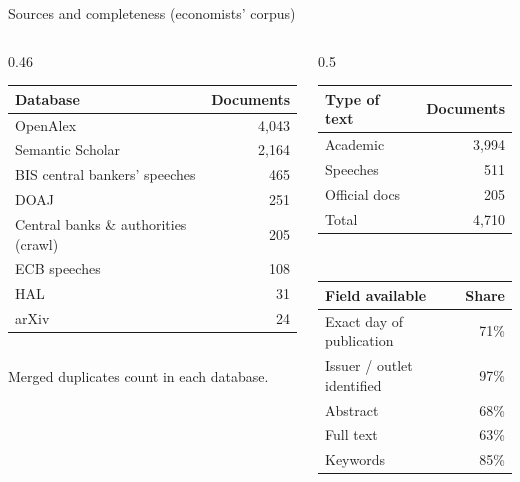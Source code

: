 \documentclass[aspectratio=169,10pt]{beamer}
\begin{document}
\begin{frame}{Sources and completeness (economists' corpus)}
\begin{columns}[T]
\begin{column}{0.46\textwidth}\footnotesize
\begin{tabular}{@{}lr@{}}\toprule
\textbf{Database} & \textbf{Documents}\\\midrule
OpenAlex & 4,043 \\
Semantic Scholar & 2,164 \\
BIS central bankers' speeches & 465 \\
DOAJ & 251 \\
Central banks \& authorities (crawl) & 205 \\
ECB speeches & 108 \\
HAL & 31 \\
arXiv & 24 \\
\bottomrule\end{tabular}\\[2pt]
\scriptsize Merged duplicates count in each database.
\end{column}
\begin{column}{0.5\textwidth}\footnotesize
\begin{tabular}{@{}lr@{}}\toprule
\textbf{Type of text} & \textbf{Documents}\\\midrule
Academic & 3,994 \\
Speeches & 511 \\
Official docs & 205 \\
\midrule Total & 4,710\\\bottomrule\end{tabular}\\[6pt]
\begin{tabular}{@{}lr@{}}\toprule
\textbf{Field available} & \textbf{Share}\\\midrule
Exact day of publication & 71\% \\
Issuer / outlet identified & 97\% \\
Abstract & 68\% \\
Full text & 63\% \\
Keywords & 85\% \\

\end{tabular}
\end{column}
\end{columns}
\end{frame}
\end{document}

